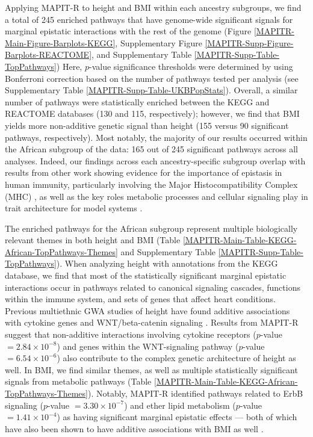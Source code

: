 \documentclass[10pt]{article}
\begin{document}
Applying MAPIT-R to height and BMI within each ancestry subgroups, we find a total of 245 enriched pathways that have genome-wide significant signals for marginal epistatic interactions with the rest of the genome (Figure \ref{MAPITR-Main-Figure-Barplots-KEGG}, Supplementary Figure \ref{MAPITR-Supp-Figure-Barplots-REACTOME}, and Supplementary Table \ref{MAPITR-Supp-Table-TopPathways}) Here, $p$-value significance thresholds were determined by using Bonferroni correction based on the number of pathways tested per analysis (see Supplementary Table \ref{MAPITR-Supp-Table-UKBPopStats}). Overall, a similar number of pathways were statistically enriched between the KEGG and REACTOME databases (130 and 115, respectively); however, we find that BMI yields more non-additive genetic signal than height (155 versus 90 significant pathways, respectively). Most notably, the majority of our results occurred within the African subgroup of the data: 165 out of 245 significant pathways across all analyses. Indeed, our findings across each ancestry-specific subgroup overlap with results from other work showing evidence for the importance of epistasis in human immunity, particularly involving the Major Histocompatibility Complex (MHC) \cite{Martin2002,Williams2005,Wan2010,Rose2012,Lareau2016,Opi2018,Zhang2019}, as well as the key roles metabolic processes and cellular signaling play in trait architecture for model systems \cite{Segre2005,Snitkin2011,Podgornaia2015,Sorrells2015,Tyler2017,Nghe2018,Jiao2019}. 

The enriched pathways for the African subgroup represent multiple biologically relevant themes in both height and BMI (Table \ref{MAPITR-Main-Table-KEGG-African-TopPathways-Themes} and Supplementary Table \ref{MAPITR-Supp-Table-TopPathways}). When analyzing height with annotations from the KEGG database, we find that most of the statistically significant marginal epistatic interactions occur in pathways related to canonical signaling cascades, functions within the immune system, and sets of genes that affect heart conditions. Previous multiethnic GWA studies of height have found additive associations with cytokine genes \cite{Marouli2017} and WNT/beta-catenin signaling \cite{Wood2014b}. Results from MAPIT-R suggest that non-additive interactions involving cytokine receptors ($p$-value $= 2.84\times 10^{-8}$) and genes within the WNT-signaling pathway ($p$-value $= 6.54\times 10^{-6}$) also contribute to the complex genetic architecture of height as well. In BMI, we find similar themes, as well as multiple statistically significant signals from metabolic pathways (Table \ref{MAPITR-Main-Table-KEGG-African-TopPathways-Themes}). Notably, MAPIT-R identified pathways related to ErbB signaling ($p$-value $= 3.30\times 10^{-7}$) and ether lipid metabolism ($p$-value $= 1.41\times 10^{-4}$) as having significant marginal epistatic effects --- both of which have also been shown to have additive associations with BMI as well \cite{Locke2015,Salinas2016,Jha2018}. 
\end{document}
